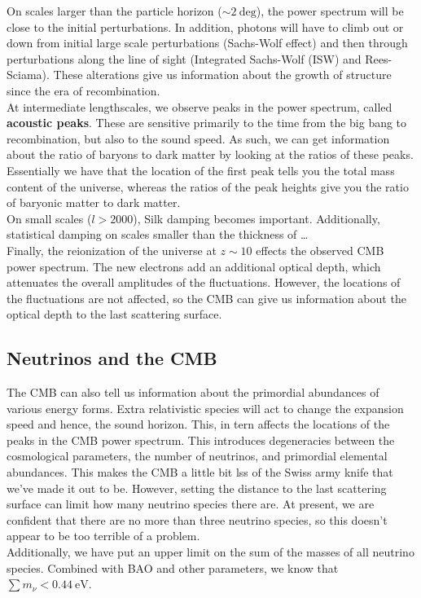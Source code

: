 \documentclass[10pt]{article}
\numberwithin{equation}{section}
\newcommand{\n}{\noindent}
\begin{document}
	\n On scales larger than the particle horizon ($\sim 2\ \mathrm{deg}$), the power spectrum will be close to the initial perturbations. In addition, photons will have to climb out or down from initial large scale perturbations (Sachs-Wolf effect) and then through perturbations along the line of sight (Integrated Sachs-Wolf (ISW) and Rees-Sciama). These alterations give us information about the growth of structure since the era of recombination.\\
	
	\n At intermediate lengthscales, we observe peaks in the power spectrum, called \textbf{acoustic peaks}. These are sensitive primarily to the time from the big bang to recombination, but also to the sound speed. As such, we can get information about the ratio of baryons to dark matter by looking at the ratios of these peaks. Essentially we have that the location of the first peak tells you the total mass content of the universe, whereas the ratios of the peak heights give you the ratio of baryonic matter to dark matter.\\
	
	\n On small scales ($l>2000$), Silk damping becomes important. Additionally, statistical damping on scales smaller than the thickness of \ldots\\
	
	\n Finally, the reionization of the universe at $z\sim 10$ effects the observed CMB power spectrum. The new electrons add an additional optical depth, which attenuates the overall amplitudes of the fluctuations. However, the locations of the fluctuations are not affected, so the CMB can give us information about the optical depth to the last scattering surface.
\subsection{Neutrinos and the CMB} %
\label{sub:neutrinos_and_the_cmb}
	The CMB can also tell us information about the primordial abundances of various energy forms. Extra relativistic species will act to change the expansion speed and hence, the sound horizon. This, in tern affects the locations of the peaks in the CMB power spectrum. This introduces degeneracies between the cosmological parameters, the number of neutrinos, and primordial elemental abundances. This makes the CMB a little bit lss of the Swiss army knife that we've made it out to be. However, setting the distance to the last scattering surface can limit how many neutrino species there are. At present, we are confident that there are no more than three neutrino species, so this doesn't appear to be too terrible of a problem.\\
	
	\n Additionally, we have put an upper limit on the sum of the masses of all neutrino species. Combined with BAO and other parameters, we know that $\sum m_\nu < 0.44\ \mathrm{eV}$. 
\end{document}
